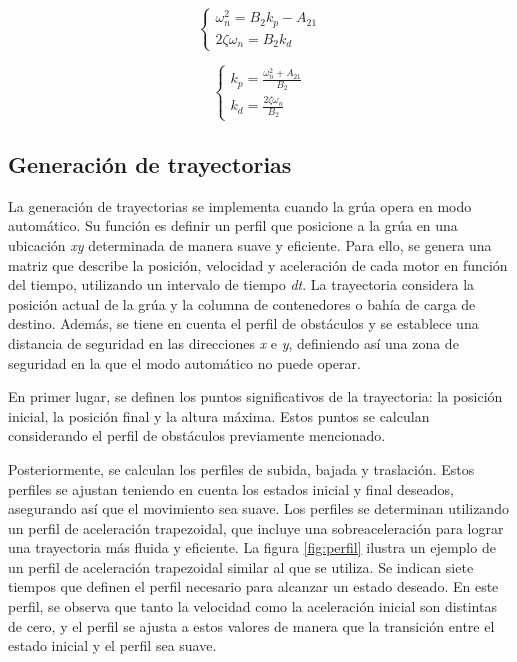 \documentclass{article}
\begin{document}
            \begin{equation}
                \begin{cases}
                    \omega_n^2 = B_{2} k_p - A_{21}\\
                    2\zeta\omega_n = B_{2} k_d
                \end{cases}
            \end{equation}

            \begin{equation}
                \begin{cases}
                    k_p = \frac{\omega_n^2 + A_{21}}{B_{2}}\\
                    k_d = \frac{2\zeta\omega_n}{B_{2}}
                \end{cases}
            \end{equation}

        \subsection{Generación de trayectorias}

            La generación de trayectorias se implementa cuando la grúa opera en modo automático. Su función es definir un perfil que posicione a la grúa en una ubicación \textit{xy} determinada de manera suave y eficiente. Para ello, se genera una matriz que describe la posición, velocidad y aceleración de cada motor en función del tiempo, utilizando un intervalo de tiempo \textit{dt}. La trayectoria considera la posición actual de la grúa y la columna de contenedores o bahía de carga de destino. Además, se tiene en cuenta el perfil de obstáculos y se establece una distancia de seguridad en las direcciones \textit{x} e \textit{y}, definiendo así una zona de seguridad en la que el modo automático no puede operar.

            En primer lugar, se definen los puntos significativos de la trayectoria: la posición inicial, la posición final y la altura máxima. Estos puntos se calculan considerando el perfil de obstáculos previamente mencionado.

            Posteriormente, se calculan los perfiles de subida, bajada y traslación. Estos perfiles se ajustan teniendo en cuenta los estados inicial y final deseados, asegurando así que el movimiento sea suave. Los perfiles se determinan utilizando un perfil de aceleración trapezoidal, que incluye una sobreaceleración para lograr una trayectoria más fluida y eficiente. La figura \ref{fig:perfil} ilustra un ejemplo de un perfil de aceleración trapezoidal similar al que se utiliza. Se indican siete tiempos que definen el perfil necesario para alcanzar un estado deseado. En este perfil, se observa que tanto la velocidad como la aceleración inicial son distintas de cero, y el perfil se ajusta a estos valores de manera que la transición entre el estado inicial y el perfil sea suave.
\end{document}
